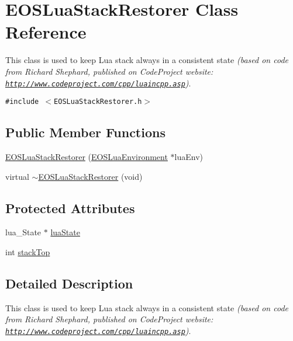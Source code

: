 \hypertarget{classEOSLuaStackRestorer}{
\section{EOSLuaStackRestorer Class Reference}
\label{classEOSLuaStackRestorer}
}
This class is used to keep Lua stack always in a consistent state {\em (based on code from Richard Shephard, published on CodeProject website: \href{http://www.codeproject.com/cpp/luaincpp.asp}{\tt http://www.codeproject.com/cpp/luaincpp.asp})\/}.  


{\tt \#include $<$EOSLuaStackRestorer.h$>$}

\subsection*{Public Member Functions}
\begin{CompactItemize}
\item 
\hyperlink{classEOSLuaStackRestorer_e3649dbb621699f8819b90a92cf99a9c}{EOSLuaStackRestorer} (\hyperlink{classEOSLuaEnvironment}{EOSLuaEnvironment} $\ast$luaEnv)
\item 
virtual \hyperlink{classEOSLuaStackRestorer_f884b6fb3dc476c864a541feec1a4450}{$\sim$EOSLuaStackRestorer} (void)
\end{CompactItemize}
\subsection*{Protected Attributes}
\begin{CompactItemize}
\item 
lua\_\-State $\ast$ \hyperlink{classEOSLuaStackRestorer_64d91d3f95091c585218086be99a2e9e}{luaState}
\item 
int \hyperlink{classEOSLuaStackRestorer_b974c1e60d9c0ec86e502457d6f6c1e5}{stackTop}
\end{CompactItemize}


\subsection{Detailed Description}
This class is used to keep Lua stack always in a consistent state {\em (based on code from Richard Shephard, published on CodeProject website: \href{http://www.codeproject.com/cpp/luaincpp.asp}{\tt http://www.codeproject.com/cpp/luaincpp.asp})\/}. 

